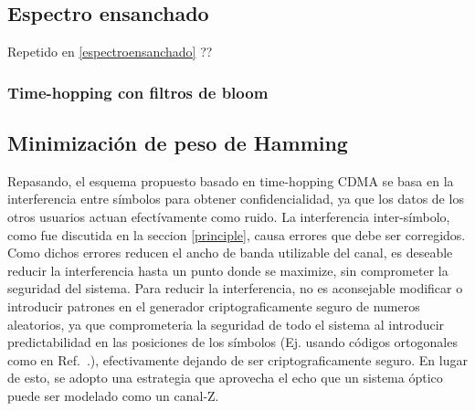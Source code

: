 \documentclass[12pt,twoside,openright]{moddalthesis}
\begin{document}
\subsection{Espectro ensanchado}

Repetido en \ref{espectroensanchado} ??
\subsubsection{Time-hopping con filtros de bloom}

\subsection{Minimización de peso de Hamming}

Repasando, el esquema propuesto basado en time-hopping CDMA se basa en la interferencia entre símbolos para obtener confidencialidad, ya que los datos de los otros usuarios actuan efectívamente como ruido.
La interferencia inter-símbolo, como fue discutida en la seccion \ref{principle}, causa errores que debe ser corregidos. Como dichos errores reducen el ancho de banda utilizable del canal, es deseable reducir la interferencia hasta un punto donde se maximize, sin comprometer la seguridad del sistema. Para reducir la interferencia, no es aconsejable modificar o introducir patrones en el generador criptograficamente seguro de numeros aleatorios, ya que comprometeria la seguridad de todo el sistema al introducir predictabilidad en las posiciones de los símbolos (Ej. usando códigos ortogonales como en Ref.~\cite{Nadarajah2006}.), efectivamente dejando de ser criptograficamente seguro.
En lugar de esto, se adopto una estrategia que aprovecha el echo que un sistema óptico puede ser modelado como un canal-Z.

\end{document}
